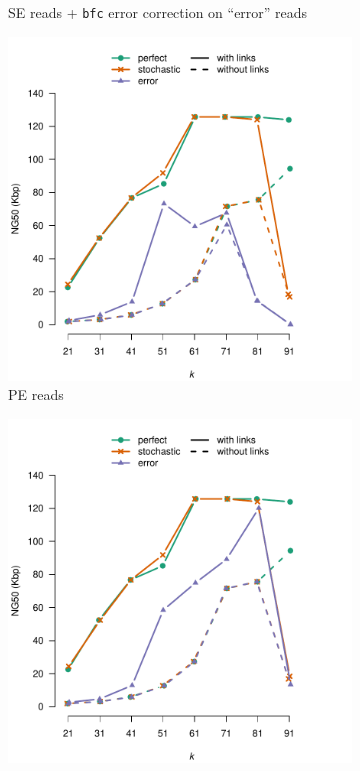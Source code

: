 \documentclass[a4paper]{article}
\begin{document}
\begin{figure}[H]
\begin{subfigure}{.45\textwidth}
\caption{SE reads + \texttt{bfc} error correction on ``error'' reads}
\end{subfigure}
\begin{subfigure}{.45\textwidth}
\centering
\includegraphics[width=1\linewidth]{../plain-vs-pe.pdf}
\caption{PE reads}
\end{subfigure}
\begin{subfigure}{.45\textwidth}
\centering
\includegraphics[width=1\linewidth]{../plain-vs-pe-corr.pdf}

\end{subfigure}
\end{figure}
\end{document}
